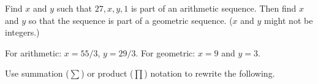 \begin{questions}
\question Find $x$ and $y$ such that $27, x, y, 1$ is part of an arithmetic sequence.  Then find $x$ and $y$ so that the sequence is part of a geometric sequence.  ($x$ and $y$ might not be integers.) 

	\begin{answer}
		For arithmetic: $x = 55/3$, $y = 29/3$.  For geometric: $x = 9$ and $y = 3$.
	\end{answer}
	
	
	


\question Use summation ($\sum$) or product ($\prod$) notation to rewrite the following.

	\begin{answer}
\end{answer}
\end{questions}
